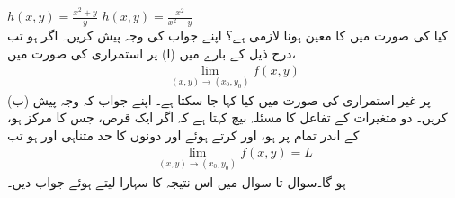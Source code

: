 $h(x,y)=\frac{x^2+y}{y}$
$h(x,y)=\frac{x^2}{x^2-y}$
\\
کیا   کی صورت میں  کا معین ہونا لازمی ہے؟ اپنے جواب کی وجہ پیش کریں۔
اگر  ہو تب درج ذیل کے بارے میں  (ا)    پر استمراری  کی صورت میں،
\begin{align*}
\lim_{(x,y)\to(x_0,y_0)} f(x,y)
\end{align*}
(ب)   پر غیر استمراری  کی صورت میں کیا کہا جا  سکتا ہے۔ اپنے جواب کہ وجہ پیش کریں۔
دو متغیرات کے تفاعل کا مسئلہ بیچ  کہتا ہے کہ اگر ایک قرص، جس کا  مرکز   ہو، کے اندر تمام  پر  ہو،  اور  کرتے ہوئے   اور  دونوں کا  حد  متناہی اور  ہو   تب
\begin{align*}
\lim_{(x,y)\to(x_0,y_0)}f(x,y)=L
\end{align*}
ہو گا۔سوال  تا سوال  میں  اس نتیجہ  کا سہارا لیتے ہوئے جواب دیں۔ 

